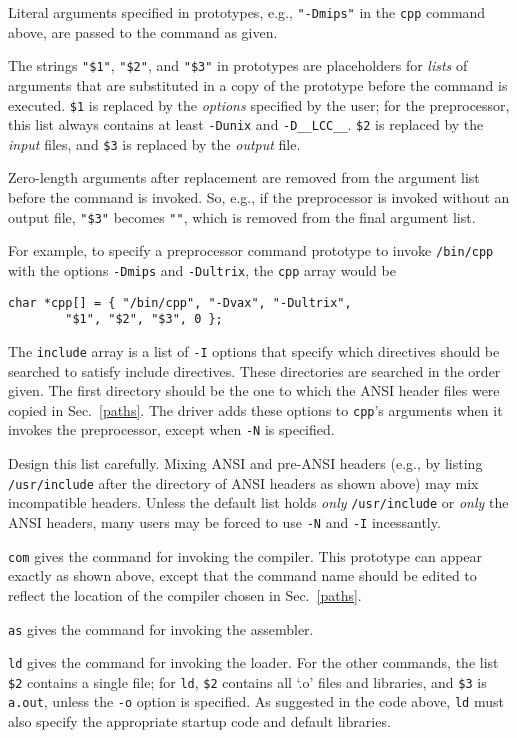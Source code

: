 Literal arguments specified in prototypes, e.g., \verb|"-Dmips"| in
the \verb|cpp| command above, are passed to the command as given.

The strings \verb|"$1"|, \verb|"$2"|, and \verb|"$3"| in
prototypes are placeholders for {\em lists} of arguments that
are substituted in a copy of the prototype before the command is executed.
\verb|$1| is replaced by the {\em options} specified by the user;
for the preprocessor, this list always contains at least
\verb|-Dunix| and \verb|-D__LCC__|.
\verb|$2| is replaced by the {\em input} files,
and \verb|$3| is replaced by the {\em output} file.

Zero-length arguments after replacement are removed from
the argument list before the command is invoked. So, e.g.,
if the preprocessor is invoked without an output file,
\verb|"$3"| becomes \verb|""|, which is removed from the final argument list.

For example, to specify a preprocessor command prototype to invoke
\verb|/bin/cpp| with the options \verb|-Dmips| and \verb|-Dultrix|,
the \verb|cpp| array would be
\begin{verbatim}
char *cpp[] = { "/bin/cpp", "-Dvax", "-Dultrix",
        "$1", "$2", "$3", 0 };
\end{verbatim}

The \verb|include| array is a list of \verb|-I| options that
specify which directives should be searched to satisfy include directives.
These directories are searched in the order given.
The first directory should be the one to which the ANSI
header files were copied in Sec.~\ref{paths}.
The driver adds these options to \verb|cpp|'s arguments
when it invokes the preprocessor, except when \verb|-N| is specified.

Design this list carefully.  Mixing ANSI and pre-ANSI headers (e.g., by
listing \verb|/usr/include| after the directory of ANSI headers as
shown above) may mix incompatible headers.  Unless the default list holds {\em only}
\verb|/usr/include| or {\em only\/} the ANSI headers, many users may be
forced to use \verb|-N| and \verb|-I| incessantly.

\verb|com| gives the command for invoking the compiler.
This prototype can appear exactly as shown above, except
that the command name should be edited to reflect the
location of the compiler chosen in Sec.~\ref{paths}.

\verb|as| gives the command for invoking the assembler.

\verb|ld| gives the command for invoking the loader.
For the other commands, the list \verb|$2| contains a single file;
for \verb|ld|, \verb|$2| contains all `.o' files and libraries, and
\verb|$3| is \verb|a.out|, unless the \verb|-o| option is specified.
As suggested in the code above, \verb|ld| must also specify
the appropriate startup code and default libraries.

